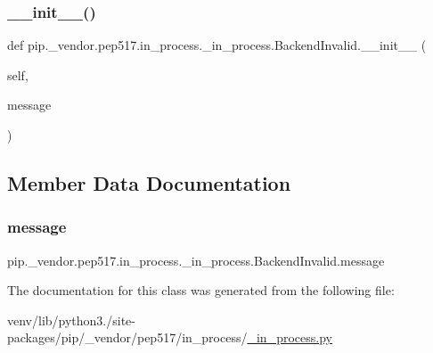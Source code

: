 \subsubsection{\texorpdfstring{\+\_\+\+\_\+init\+\_\+\+\_\+()}{\_\_init\_\_()}}
{\footnotesize\ttfamily def pip.\+\_\+vendor.\+pep517.\+in\+\_\+process.\+\_\+in\+\_\+process.\+Backend\+Invalid.\+\_\+\+\_\+init\+\_\+\+\_\+ (\begin{DoxyParamCaption}\item[{}]{self,  }\item[{}]{message }\end{DoxyParamCaption})}



\subsection{Member Data Documentation}
\mbox{\label{classpip_1_1__vendor_1_1pep517_1_1in__process_1_1__in__process_1_1BackendInvalid_ad9d366caa846be0c0d022851ac5a99d7}} 
\subsubsection{\texorpdfstring{message}{message}}
{\footnotesize\ttfamily pip.\+\_\+vendor.\+pep517.\+in\+\_\+process.\+\_\+in\+\_\+process.\+Backend\+Invalid.\+message}



The documentation for this class was generated from the following file\+:\begin{DoxyCompactItemize}
\item 
venv/lib/python3./site-\/packages/pip/\+\_\+vendor/pep517/in\+\_\+process/\hyperlink{__in__process_8py}{\+\_\+in\+\_\+process.\+py}\end{DoxyCompactItemize}
